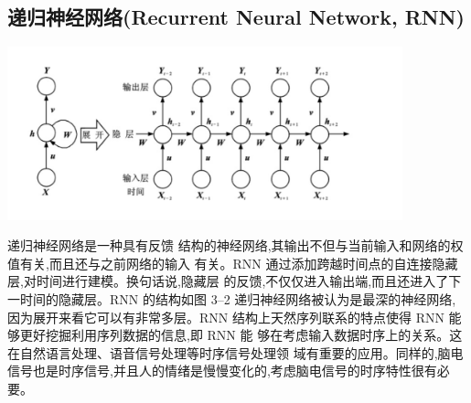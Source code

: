 \subsection{递归神经网络(Recurrent Neural Network, RNN)}{
	\centerline{\includegraphics[width=4.5in]{figure/rnn.png}}
	递归神经网络是一种具有反馈 结构的神经网络,其输出不但与当前输入和网络的权值有关,而且还与之前网络的输入 有关。RNN 通过添加跨越时间点的自连接隐藏层,对时间进行建模。换句话说,隐藏层 的反馈,不仅仅进入输出端,而且还进入了下一时间的隐藏层。RNN 的结构如图 3–2
递归神经网络被认为是最深的神经网络,因为展开来看它可以有非常多层。RNN 结构上天然序列联系的特点使得 RNN 能够更好挖掘利用序列数据的信息,即 RNN 能 够在考虑输入数据时序上的关系。这在自然语言处理、语音信号处理等时序信号处理领 域有重要的应用。同样的,脑电信号也是时序信号,并且人的情绪是慢慢变化的,考虑脑电信号的时序特性很有必要。
}

